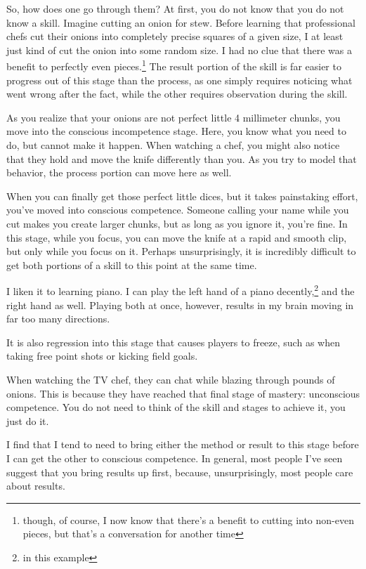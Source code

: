 \documentclass[12pt]{article}
\renewcommand{\,}{\textsuperscript{,}}
\begin{document}
So, how does one go through them?  
At first, you do not know that you do not know a skill.  
Imagine cutting an onion for stew.  
Before learning that professional chefs cut their onions into completely precise squares of a given size, I at least just kind of cut the onion into some random size.  
I had no clue that there was a benefit to perfectly even pieces.\footnote{though, of course, I now know that there's a benefit to cutting into non-even pieces, but that's a conversation for another time}  
The result portion of the skill is far easier to progress out of this stage than the process, as one simply requires noticing what went wrong after the fact, while the other requires observation during the skill.

As you realize that your onions are not perfect little 4 millimeter chunks, you move into the conscious incompetence stage.  
Here, you know what you need to do, but cannot make it happen.  
When watching a chef, you might also notice that they hold and move the knife differently than you.  
As you try to model that behavior, the process portion can move here as well.

When you can finally get those perfect little dices, but it takes painstaking effort, you've moved into conscious competence.  
Someone calling your name while you cut makes you create larger chunks, but as long as you ignore it, you're fine.  
In this stage, while you focus, you can move the knife at a rapid and smooth clip, but only while you focus on it.  
Perhaps unsurprisingly, it is incredibly difficult to get both portions of a skill to this point at the same time.

I liken it to learning piano.  
I can play the left hand of a piano decently,\footnote{in this example} and the right hand as well.  
Playing both at once, however, results in my brain moving in far too many directions.

It is also regression into this stage that causes players to freeze, such as when taking free point shots or kicking field goals.

When watching the TV chef, they can chat while blazing through pounds of onions.  
This is because they have reached that final stage of mastery: unconscious competence.  
You do not need to think of the skill and stages to achieve it, you just do it.

I find that I tend to need to bring either the method or result to this stage before I can get the other to conscious competence.  
In general, most people I've seen suggest that you bring results up first, because, unsurprisingly, most people care about results.
\end{document}
